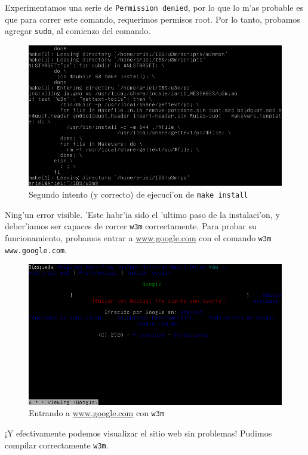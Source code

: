 \documentclass[11pt]{article}
\begin{document}
	Experimentamos una serie de \texttt{Permission denied}, por lo que lo m'as probable es que para correr este comando, requerimos permisos root. Por lo tanto, probamos agregar \texttt{sudo}, al comienzo del comando.
	
	\begin{figure}[H]
		\centering \captionsetup{justification=centering}
		\includegraphics[width=.8\linewidth]{Images/Compile_w3m/make-install_successful}
		\caption{Segundo intento (y correcto) de ejecuci'on de \texttt{make install}}
		\label{fig:make-install_successful}
	\end{figure}
	
	Ning'un error visible. 'Este habr'ia sido el 'ultimo paso de la instalaci'on, y deber'iamos ser capaces de correr \texttt{w3m} correctamente. Para probar su funcionamiento, probamos entrar a \url{www.google.com} con el comando \texttt{w3m www.google.com}.
	
	\begin{figure}[H]
		\centering \captionsetup{justification=centering}
		\includegraphics[width=.8\linewidth]{Images/Compile_w3m/test_w3m}
		\caption{Entrando a \url{www.google.com} con \texttt{w3m}}
		\label{fig:test_w3m}
	\end{figure}
	
	¡Y efectivamente podemos visualizar el sitio web sin problemas! Pudimos compilar correctamente \texttt{w3m}.
		
\end{document}
